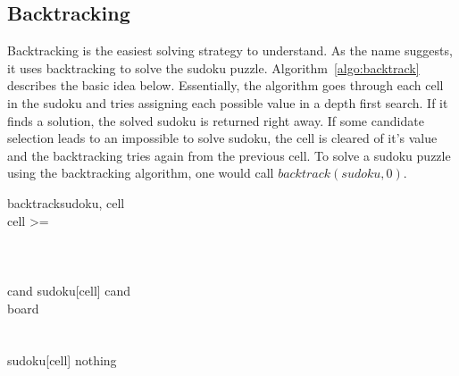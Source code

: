 \subsection{Backtracking}
Backtracking is the easiest solving strategy to understand. As the name suggests, it uses backtracking to solve the sudoku puzzle.
Algorithm~\ref{algo:backtrack} describes the basic idea below. Essentially, the algorithm goes through each cell in the sudoku and
tries assigning each possible value in a depth first search. If it finds a solution, the solved sudoku is returned right away. If
some candidate selection leads to an impossible to solve sudoku, the cell is cleared of it's value and the backtracking tries again
from the previous cell. To solve a sudoku puzzle using the backtracking algorithm, one would call $backtrack(sudoku, 0)$.
\begin{center}
\begin{pseudocode}[framebox]{backtrack}{sudoku, cell}
                             \\
    \IF cell >=  \THEN {} \\
     \\
    \IF {} \THEN
                                  \\
       \\
    \FOREACH cand \in {} \DO \BEGIN
        sudoku[cell] \GETS cand                                     \\
        board \GETS {}              \\
        \IF {} \THEN {}            \\
    \END                                                            \\
    sudoku[cell] \GETS nothing                                      \\
    ~
    \label{algo:backtrack}
\end{pseudocode}
\end{center}

